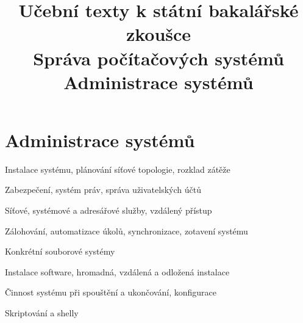 \clearpage  \clearpage
\title{\LARGE Učební texty k státní bakalářské zkoušce \\ Správa počítačových systémů \\ Administrace systémů}

\maketitle
\newpage
\setcounter{section}{5}
\section{Administrace systémů}
\begin{pozadavky}
\begin{pitemize}
\item Instalace systému, plánování síťové topologie, rozklad zátěže
\item Zabezpečení, systém práv, správa uživatelských účtů
\item Síťové, systémové a adresářové služby, vzdálený přístup
\item Zálohování, automatizace úkolů, synchronizace, zotavení systému
\item Konkrétní souborové systémy
\item Instalace software, hromadná, vzdálená a odložená instalace
\item Činnost systému při spouštění a ukončování, konfigurace
\item Skriptování a shelly
\end{pitemize}
\end{pozadavky}










